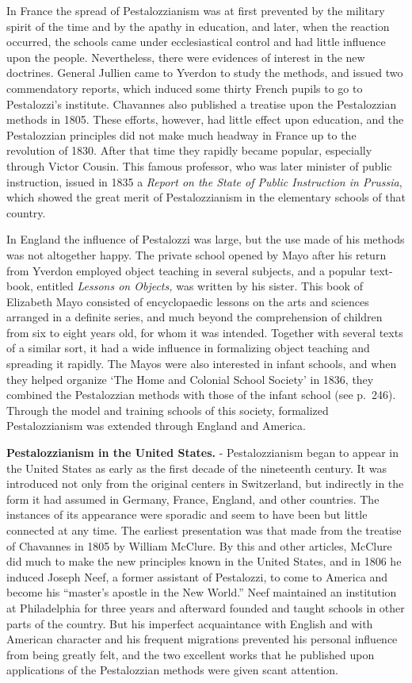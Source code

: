 \documentclass[]{book}
\begin{document}
In France the spread of Pestalozzianism was at first prevented by the military spirit of the time and by the apathy in education, and later, when the reaction occurred, the schools came under ecclesiastical control and had little influence upon the people. Nevertheless, there were evidences of interest in the new doctrines. General Jullien came to Yverdon to study the methods, and issued two commendatory reports, which induced some thirty French pupils to go to Pestalozzi's institute. Chavannes also published a treatise upon the Pestalozzian methods in 1805. These efforts, however, had little effect upon education, and the Pestalozzian principles did not make much headway in France up to the revolution of 1830. After that time they rapidly became popular, especially through Victor Cousin. This famous professor, who was later minister of public instruction, issued in 1835 a \emph{Report on the State of Public Instruction in Prussia}, which showed the great merit of Pestalozzianism in the elementary schools of that country.

In England the influence of Pestalozzi was large, but the use made of his methods was not altogether happy. The private school opened by Mayo after his return from Yverdon employed object teaching in several subjects, and a popular text-book, entitled \emph{Lessons on Objects,} was written by his sister. This book of Elizabeth Mayo consisted of encyclopaedic lessons on the arts and sciences arranged in a definite series, and much beyond the comprehension of children from six to eight years old, for whom it was intended. Together with several texts of a similar sort, it had a wide influence in formalizing object teaching and spreading it rapidly. The Mayos were also interested in infant schools, and when they helped organize `The Home and Colonial School Society' in 1836, they combined the Pestalozzian methods with those of the infant school (see p.~246). Through the model and training schools of this society, formalized Pestalozzianism was extended through England and America.

\textbf{Pestalozzianism in the United States.} - Pestalozzianism began to appear in the United States as early as the first decade of the nineteenth century. It was introduced not only from the original centers in Switzerland, but indirectly in the form it had assumed in Germany, France, England, and other countries. The instances of its appearance were sporadic and seem to have been but little connected at any time. The earliest presentation was that made from the treatise of Chavannes in 1805 by William McClure. By this and other articles, McClure did much to make the new principles known in the United States, and in 1806 he induced Joseph Neef, a former assistant of Pestalozzi, to come to America and become his ``master's apostle in the New World.'' Neef maintained an institution at Philadelphia for three years and afterward founded and taught schools in other parts of the country. But his imperfect acquaintance with English and with American character and his frequent migrations prevented his personal influence from being greatly felt, and the two excellent works that he published upon applications of the Pestalozzian methods were given scant attention.
\end{document}
